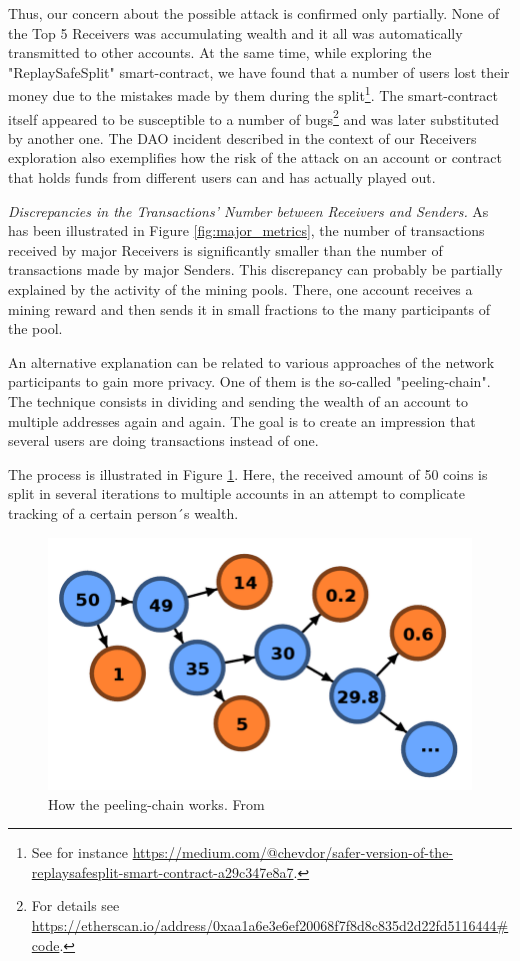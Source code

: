 Thus, our concern about the possible attack is confirmed only partially.
None of the Top 5 Receivers was accumulating wealth and it all was automatically transmitted to other accounts.
At the same time, while exploring the "ReplaySafeSplit" smart-contract, we have found that a number of users lost their money due to the mistakes made by them during the split\footnote{See for instance \url{https://medium.com/@chevdor/safer-version-of-the-replaysafesplit-smart-contract-a29c347e8a7}.}.
The smart-contract itself appeared to be susceptible to a number of bugs\footnote{For details see \url{https://etherscan.io/address/0xaa1a6e3e6ef20068f7f8d8c835d2d22fd5116444\#code}.} and was later substituted by another one.
The DAO incident described in the context of our Receivers exploration also exemplifies how the risk of the attack on an account or contract that holds funds from different users can and has actually played out.

\textit{Discrepancies in the Transactions' Number between Receivers and Senders.} 
As has been illustrated in Figure \ref{fig:major_metrics}, the number of transactions received by major Receivers is significantly smaller than the number of transactions made by major Senders.
This discrepancy can probably be partially explained by the activity of the mining pools.
There, one account receives a mining reward and then sends it in small fractions to the many participants of the pool.

An alternative explanation can be related to various approaches of the network participants to gain more privacy.
One of them is the so-called "peeling-chain".
The technique consists in dividing and sending the wealth of an account to multiple addresses again and again.
The goal is to create an impression that several users are doing transactions instead of one.

The process is illustrated in Figure \ref{fig:peeling_chain}.
Here, the received amount of 50 coins is split in several iterations to multiple accounts in an attempt to complicate tracking of a certain person´s wealth.

\begin{figure}[h]
  \centering
  \includegraphics[width=\linewidth]{figures/peelingchain.png}
  \caption{How the peeling-chain works. From \cite{balthasar2017laundary}}
  \label{fig:peeling_chain}
\end{figure}

